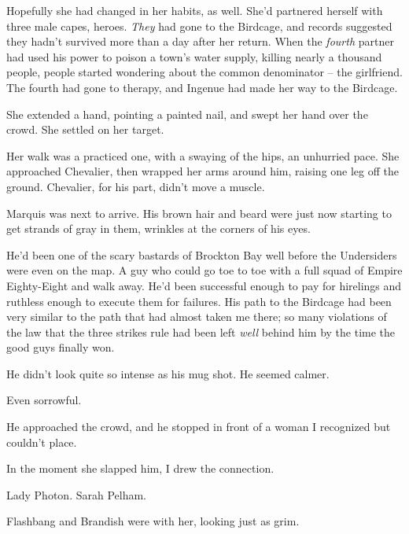 Hopefully she had changed in her habits, as well.  She'd partnered herself with three male capes, heroes.  \emph{They }had gone to the Birdcage, and records suggested they hadn't survived more than a day after her return.  When the \emph{fourth} partner had used his power to poison a town's water supply, killing nearly a thousand people, people started wondering about the common denominator – the girlfriend.  The fourth had gone to therapy, and Ingenue had made her way to the Birdcage.



She extended a hand, pointing a painted nail, and swept her hand over the crowd.  She settled on her target.



Her walk was a practiced one, with a swaying of the hips, an unhurried pace.  She approached Chevalier, then wrapped her arms around him, raising one leg off the ground.  Chevalier, for his part, didn't move a muscle.



Marquis was next to arrive.  His brown hair and beard were just now starting to get strands of gray in them, wrinkles at the corners of his eyes.



He'd been one of the scary bastards of Brockton Bay well before the Undersiders were even on the map.  A guy who could go toe to toe with a full squad of Empire Eighty-Eight and walk away.   He'd been successful enough to pay for hirelings and ruthless enough to execute them for failures.  His path to the Birdcage had been very similar to the path that had almost taken me there; so many violations of the law that the three strikes rule had been left \emph{well} behind him by the time the good guys finally won.



He didn't look quite so intense as his mug shot.  He seemed calmer.



Even sorrowful.



He approached the crowd, and he stopped in front of a woman I recognized but couldn't place.



In the moment she slapped him, I drew the connection.



Lady Photon.  Sarah Pelham.



Flashbang and Brandish were with her, looking just as grim.



